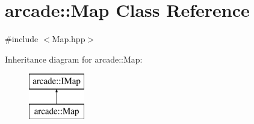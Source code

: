 \hypertarget{classarcade_1_1_map}{}\section{arcade\+:\+:Map Class Reference}
\label{classarcade_1_1_map}


{\ttfamily \#include $<$Map.\+hpp$>$}

Inheritance diagram for arcade\+:\+:Map\+:\begin{figure}[H]
\begin{center}
\leavevmode
\includegraphics[height=2.000000cm]{classarcade_1_1_map}
\end{center}
\end{figure}
